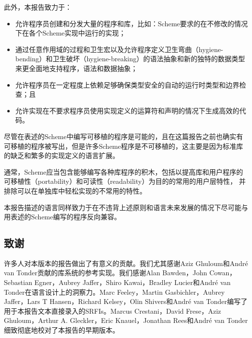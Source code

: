 此外，本报告致力于：

\begin{itemize}

\item 允许程序员创建和分发大量的程序和库，比如：Scheme要求的在不修改的情况下在各个Scheme实现中运行的实现；

\item 通过任意作用域的过程和卫生宏以及允许程序定义卫生弯曲（hygiene-bending）和卫生破坏（hygiene-breaking）的语法抽象和新的独特的数据类型来更全面地支持程序，语法和数据抽象；

\item 允许程序员在一定程度上依赖足够确保类型安全的自动的运行时类型和边界检查；且

\item 允许实现在不要求程序员使用实现定义的运算符和声明的情况下生成高效的代码。
\end{itemize}

尽管在表述的Scheme中编写可移植的程序是可能的，且在这篇报告之前也确实有可移植的程序被写出，但是许多Scheme程序是不可移植的，这主要是因为标准库的缺乏和繁多的实现定义的语言扩展。

通常，Scheme应当包含能够编写各种库程序的积木，包括以提高库和用户程序的
可移植性（portability）和可读性（readability）为目的的常用的用户层特性，
并排除可以在单独库中轻松实现的不常用的特性。

本报告描述的语言同样致力于在不违背上述原则和语言未来发展的情况下尽可能与用表述的Scheme编写的程序反向兼容。

\subsection*{致谢}

许多人对本版本的报告做出了有意义的贡献。我们尤其感谢Aziz Ghuloum和André van Tonder贡献的库系统的参考实现。我们感谢Alan Bawden，John Cowan，Sebastian Egner，Aubrey Jaffer，Shiro Kawai，Bradley Lucier和André van Tonder在语言设计上的洞察力。Marc Feeley，Martin Gasbichler，Aubrey Jaffer，Lars T Hansen，Richard Kelsey，Olin Shivers和André van Tonder编写了用于本报告文本直接录入的SRFIs。Marcus Crestani，David Frese，Aziz Ghuloum，Arthur A. Gleckler，Eric Knauel，Jonathan Rees和André van Tonder细致彻底地校对了本报告的早期版本。

